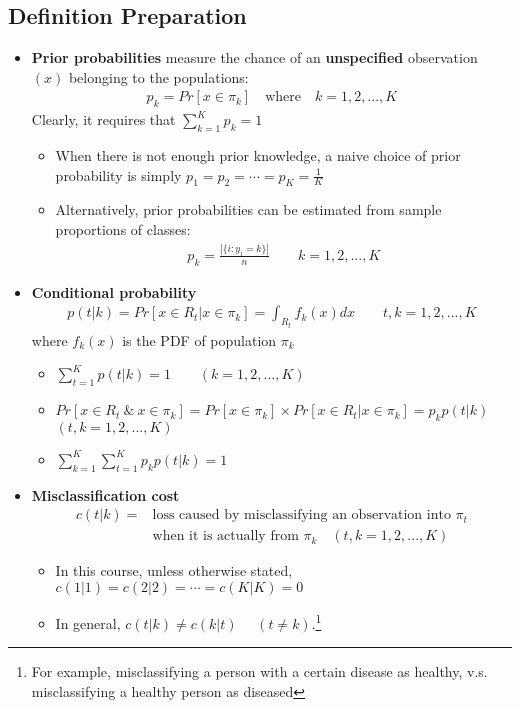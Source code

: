 \documentclass[12pt]{extarticle}
\newcommand{\<}{\langle}
\renewcommand{\>}{\rangle}
\theoremstyle{definition}
\begin{document}
\subsection{Definition Preparation}
\begin{itemize}
    \item \textbf{Prior probabilities} measure the chance of an \textbf{unspecified} observation $(x)$ belonging to the populations:
    \begin{align*}
        p_k = Pr[x\in \pi_k] \quad \text{where} \quad k=1,2,...,K
    \end{align*}
    Clearly, it requires that $\sum^K_{k=1}p_k =1$
    \begin{itemize}
        \item When there is not enough prior knowledge, a naive choice of prior probability is simply $p_1 =p_2 =\cdots =p_K =\frac{1}{K}$
        \item Alternatively, prior probabilities can be estimated from sample proportions of classes:
        \begin{align*}
            p_k = \frac{|\{i:y_i =k\}|}{n} \qquad k=1,2,...,K
        \end{align*}
    \end{itemize}
    \item \textbf{Conditional probability}
    \begin{align*}
        p(t|k)=Pr[x\in R_t|x\in \pi_k] = \int_{R_t} f_k(x)dx \qquad t,k=1,2,...,K
    \end{align*}
    where $f_k(x)$ is the PDF of population $\pi_k$ \begin{itemize}
        \item $\sum^K_{t=1} p(t|k)=1 \qquad (k=1,2,...,K)$\\
        \item $Pr[x\in R_t \ \& \  x\in \pi_k] = Pr[x\in \pi_k] \times Pr[x\in R_t|x\in \pi_k] = p_k p(t|k)$\\
        $(t,k=1,2,...,K)$\\
        \item $\sum^K_{k=1}\sum^K_{t=1} p_k p(t|k) =1$
    \end{itemize}
    \item \textbf{Misclassification cost}
    \begin{align*}
        c(t|k)= &\text{loss caused by misclassifying an observation into $\pi_t$}\\
        &\text{when it is actually from $\pi_k$} \quad (t,k=1,2,...,K)
    \end{align*}
    \begin{itemize}
        \item In this course, unless otherwise stated, $c(1|1)=c(2|2)=\cdots =c(K|K)=0$\\
        \item In general, $c(t|k) \neq c(k|t)$ \ \ $(t \neq k)$.\footnote{For example, misclassifying a person with a certain disease as healthy, v.s. misclassifying a healthy person as diseased}
    \end{itemize}
\end{itemize}
\end{document}
